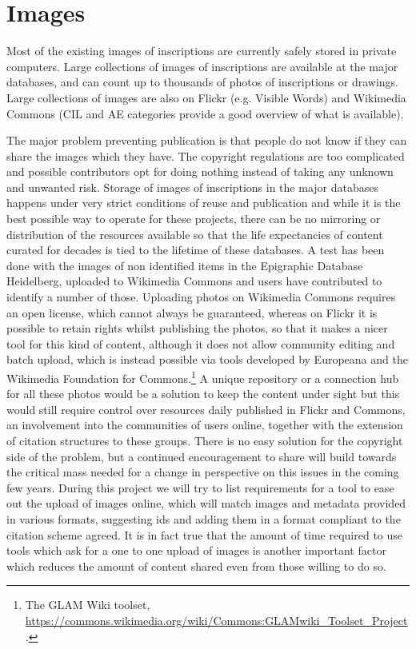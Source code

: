 \documentclass[amsthm,ebook]{saparticle}
\begin{document}
\section{Images}
\noindent Most of the existing images of inscriptions are currently safely stored in private computers. Large collections of images of inscriptions are available at the major databases, and can count up to thousands of photos of inscriptions or drawings. Large collections of images are also on Flickr (e.g. Visible Words) and Wikimedia Commons (CIL and AE categories provide a good overview of what is available).

The major problem preventing publication is that people do not know if they can share the images which they have. The copyright regulations are too complicated and possible contributors opt for doing nothing instead of taking any unknown and unwanted risk. 
Storage of images of inscriptions in the major databases happens under very strict conditions of reuse and publication and while it is the best possible way to operate for these projects, there can be no mirroring or distribution of the resources available so that the life expectancies of content curated for decades is tied to  the lifetime of these databases. A test has been done with the images of non identified items in the Epigraphic Database Heidelberg, uploaded to Wikimedia Commons and users have contributed to identify a number of those. 
Uploading photos on Wikimedia Commons requires an open license, which cannot always be guaranteed, whereas on Flickr it is possible to retain rights whilst publishing the photos, so that it makes a nicer tool for this kind of content, although it does not allow community editing and batch upload, which is instead possible via tools developed by Europeana and the Wikimedia Foundation for Commons.\footnote{The GLAM Wiki toolset, \url{https://commons.wikimedia.org/wiki/Commons:GLAMwiki_Toolset_Project}.}
A unique repository or a connection hub for all these photos would be a solution to keep the content under sight but this would still require control over resources daily published in Flickr and Commons, an involvement into the communities of users online, together with the extension of citation structures to these groups. There is no easy solution for the copyright side of the problem, but a continued encouragement to share will build towards the critical mass needed for a change in perspective on this issues in the coming few years. During this project we will try to list requirements for a tool to ease out the upload of images online, which will match images and metadata provided in various formats, suggesting ids and adding them in a format compliant to the citation scheme agreed. It is in fact true that the amount of time required to use tools which ask for a one to one upload of images is another important factor which reduces the amount of content shared even from those willing to do so.
\end{document}
